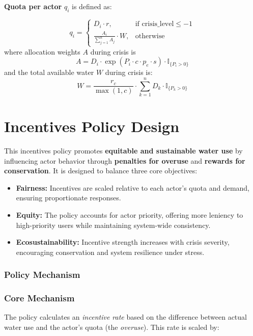 \documentclass[ruler]{CUP-JNL-EDS}%
\begin{document}
\textbf{Quota per actor} $q_i$ is defined as:

\[
q_i =
\begin{cases}
D_i \cdot r, & \text{if } \text{crisis\_level} \leq -1 \\[12pt]
\displaystyle
\frac{A_i}
{\sum\limits_{j=1}^n A_j}
\cdot W, & \text{otherwise}

\end{cases}
\]
where allocation weights $A$ during crisis is
\[
A = D_i \cdot \exp\left(P_i \cdot c \cdot p_e \cdot s \right) \cdot \mathbb{I}_{\{P_i > 0\}}
\]
and the total available water $W$ during crisis is:
\[
W = \frac{r_c}{\max(1, c)} \cdot \sum_{k=1}^n D_k \cdot \mathbb{I}_{\{P_k > 0\}}
\]

\section{Incentives Policy Design}
This incentives policy promotes \textbf{equitable and sustainable water use} by influencing actor behavior 
through \textbf{penalties for overuse} and \textbf{rewards for conservation}. It is designed to balance three core objectives:

\begin{itemize}
    \item \textbf{Fairness:} Incentives are scaled relative to each actor’s quota and demand, ensuring proportionate responses.
    \item \textbf{Equity:} The policy accounts for actor priority, offering more leniency to high-priority users while maintaining system-wide consistency.
    \item \textbf{Ecosustainability:} Incentive strength increases with crisis severity, encouraging conservation and system resilience under stress.
\end{itemize}

\subsubsection{Policy Mechanism}
\subsubsection*{Core Mechanism}
The policy calculates an \textit{incentive rate} based on the difference between actual water use and the actor’s quota 
(the \textit{overuse}). This rate is scaled by:
\end{document}

